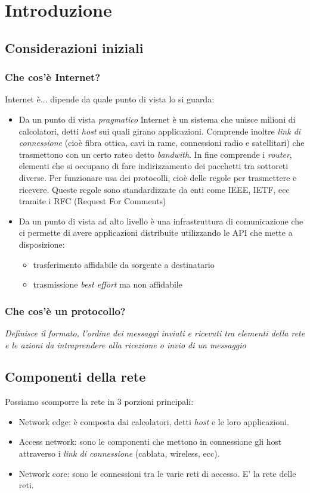 \section{Introduzione}
\subsection{Considerazioni iniziali}
\subsubsection{Che cos'è Internet?}
Internet è... dipende da quale punto di vista lo si guarda:
\begin{itemize}
    \item Da un punto di vista \emph{pragmatico} Internet è un sistema che unisce milioni di calcolatori, detti \emph{host} sui quali girano applicazioni. Comprende inoltre \emph{link di connessione} (cioè fibra ottica, cavi in rame, connessioni radio e satellitari) che trasmettono con un certo rateo detto \emph{bandwith}. In fine comprende i \emph{router}, elementi che si occupano di fare indirizzamento dei pacchetti tra sottoreti diverse. Per funzionare usa dei protocolli, cioè delle regole per trasmettere e ricevere. Queste regole sono standardizzate da enti come IEEE, IETF, ecc tramite i RFC (Request For Comments)
    
    \item Da un punto di vista ad alto livello è una infrastruttura di comunicazione che ci permette di avere applicazioni distribuite utilizzando le API che mette a disposizione:
    \begin{itemize}
        \item trasferimento affidabile da sorgente a destinatario
        \item trasmissione \emph{best effort} ma non affidabile
    \end{itemize}
\end{itemize}

\subsubsection{Che cos'è un protocollo?}
\emph{Definisce il formato, l'ordine dei messaggi inviati e ricevuti tra elementi della rete e le azioni da intraprendere alla ricezione o invio di un messaggio}


\subsection{Componenti della rete}
Possiamo scomporre la rete in 3 porzioni principali:
\begin{itemize}
    \item Network edge: è composta dai calcolatori, detti \emph{host} e le loro applicazioni.
    \item Access network: sono le componenti che mettono in connessione gli host attraverso i \emph{link di connessione} (cablata, wireless, ecc).
    \item Network core: sono le connessioni tra le varie reti di accesso. E' la rete delle reti.
\end{itemize}

